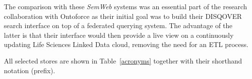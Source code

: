 The comparison with these \emph{SemWeb} systems was an essential part of the research collaboration with Ontoforce as their initial goal was to build their DISQOVER search interface on top of a federated querying system. The advantage of the latter is that their interface would then provide a live view on a continuously updating Life Sciences Linked Data cloud, removing the need for an ETL process.

All selected stores are shown in Table~\ref{acronyms} together with their shorthand notation (prefix).

\begin{table}[ht!]
	\centering
	\caption{List of the tested systems and their acronyms. The first four are enterprise systems. %
	}
	\label{acronyms}
\end{table}